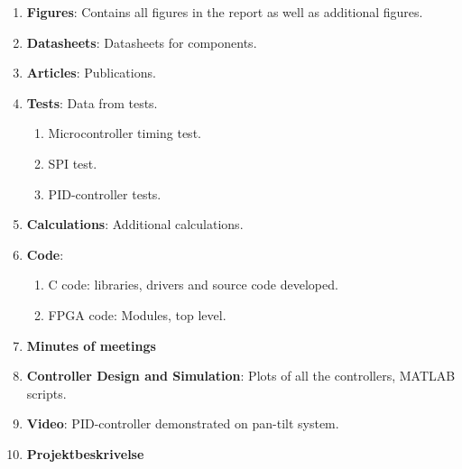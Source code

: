 \documentclass[../../main.tex]{subfiles}
\begin{document}
\begin{enumerate}
    \item \textbf{Figures}: Contains all figures in the report as well as additional figures.
    \item \textbf{Datasheets}: Datasheets for components.
    \item \textbf{Articles}: Publications.
    \item \textbf{Tests}: Data from tests.
    \begin{enumerate}
        \item Microcontroller timing test.
        \item SPI test.
        \item PID-controller tests.
    \end{enumerate}
    \item \textbf{Calculations}: Additional calculations.
    \item \textbf{Code}: 
    \begin{enumerate}
        \item C code: libraries, drivers and source code developed.
        \item FPGA code: Modules, top level.
    \end{enumerate}
    \item \textbf{Minutes of meetings}
    \item \textbf{Controller Design and Simulation}: Plots of all the controllers, MATLAB scripts.
    \item \textbf{Video}: PID-controller demonstrated on pan-tilt system.
    \item \textbf{Projektbeskrivelse}
\end{enumerate}        
\end{document}
